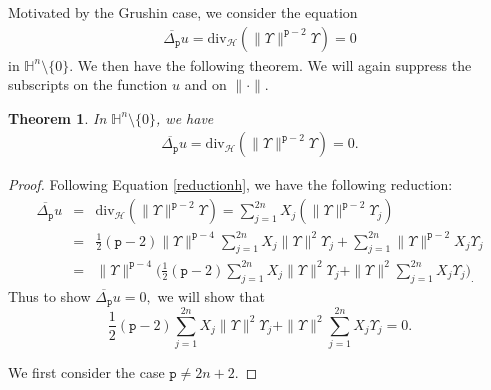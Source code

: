 \documentclass[12pt]{amsart}
\theoremstyle{plain}
\newtheorem{theorem}{Theorem}[section]
\theoremstyle{definition}
\numberwithin{equation}{section}
\begin{document}
Motivated by the Grushin case, we consider the equation 
\begin{eqnarray*}
\overline{\Delta_{\texttt{p}}}u={\operatorname{div_{\mathcal{H}}}} (\| \Upsilon\|^{{\texttt{p}}-2}\Upsilon  )=0
\end{eqnarray*}
in $\mathbb{H}^n\setminus\{0\}$. 
We then have the following theorem. We will again suppress the subscripts on the function $u$ and on $\|\cdot\|$. 
\begin{theorem}
In $\mathbb{H}^n\setminus\{0\}$, we have
\begin{eqnarray*}
\overline{\Delta_{\texttt{p}}}u={\operatorname{div_{\mathcal{H}}}}(\| \Upsilon\|^{{\texttt{p}}-2} \Upsilon)=0.
\end{eqnarray*}
\end{theorem}
\begin{proof}
Following Equation \eqref{reductionh}, we have the following reduction:
\begin{eqnarray}
\overline{\Delta_{\texttt{p}}} u & = & {\operatorname{div_{\mathcal{H}}}}(\|\Upsilon \|^{{\texttt{p}}-2}\Upsilon) = \sum_{j=1}^{2n}X_j(\|\Upsilon\|^{{\texttt{p}}-2}\Upsilon_j) \nonumber\\
& = & \frac{1}{2}({\texttt{p}}-2)\|\Upsilon\|^{{\texttt{p}}-4}\sum_{j=1}^{2n}X_j\|\Upsilon \|^{2}\Upsilon_j+\sum_{j=1}^{2n}\|\Upsilon\|^{{\texttt{p}}-2}X_j\Upsilon_j \nonumber \\ 
& = & \|\Upsilon\|^{{\texttt{p}}-4}\Bigg(\frac{1}{2}({\texttt{p}}-2)\sum_{j=1}^{2n}X_j\|\Upsilon \|^{2} \Upsilon_j +\|\Upsilon\|^{2}\sum_{j=1}^{2n}X_j\Upsilon_j\Bigg)_.  \label{hform}
\end{eqnarray}
Thus to show $\overline{\Delta_{\texttt{p}}} u = 0,$ we will show that 
\begin{equation}\label{lambda}
\frac{1}{2}({\texttt{p}}-2)\sum_{j=1}^{2n}X_j\|\Upsilon \|^{2} \Upsilon_j +\|\Upsilon\|^{2}\sum_{j=1}^{2n}X_j\Upsilon_j = 0.
\end{equation}

We first consider the case ${\texttt{p}} \neq 2n+2$. 


\end{proof}
\end{document}
